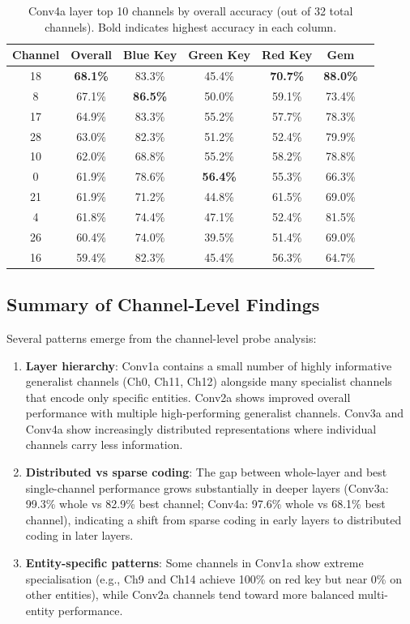 \documentclass[12pt,a4paper]{report}
\begin{document}
\begin{table}[H]
\centering
\caption[Conv4a top 10 channel probe accuracies]{Conv4a layer top 10 channels by overall accuracy (out of 32 total channels). Bold indicates highest accuracy in each column.}
\label{tab:conv4a_top10}
\begin{tabular}{ccccccc}
\toprule
Channel & Overall & Blue Key & Green Key & Red Key & Gem \\
\midrule
18 & \textbf{68.1\%} & 83.3\% & 45.4\% & \textbf{70.7\%} & \textbf{88.0\%} \\
8 & 67.1\% & \textbf{86.5\%} & 50.0\% & 59.1\% & 73.4\% \\
17 & 64.9\% & 83.3\% & 55.2\% & 57.7\% & 78.3\% \\
28 & 63.0\% & 82.3\% & 51.2\% & 52.4\% & 79.9\% \\
10 & 62.0\% & 68.8\% & 55.2\% & 58.2\% & 78.8\% \\
0 & 61.9\% & 78.6\% & \textbf{56.4\%} & 55.3\% & 66.3\% \\
21 & 61.9\% & 71.2\% & 44.8\% & 61.5\% & 69.0\% \\
4 & 61.8\% & 74.4\% & 47.1\% & 52.4\% & 81.5\% \\
26 & 60.4\% & 74.0\% & 39.5\% & 51.4\% & 69.0\% \\
16 & 59.4\% & 82.3\% & 45.4\% & 56.3\% & 64.7\% \\
\bottomrule
\end{tabular}
\end{table}

\subsection{Summary of Channel-Level Findings}

Several patterns emerge from the channel-level probe analysis:

\begin{enumerate}
\item \textbf{Layer hierarchy}: Conv1a contains a small number of highly informative generalist channels (Ch0, Ch11, Ch12) alongside many specialist channels that encode only specific entities. Conv2a shows improved overall performance with multiple high-performing generalist channels. Conv3a and Conv4a show increasingly distributed representations where individual channels carry less information. 

\item \textbf{Distributed vs sparse coding}: The gap between whole-layer and best single-channel performance grows substantially in deeper layers (Conv3a: 99.3\% whole vs 82.9\% best channel; Conv4a: 97.6\% whole vs 68.1\% best channel), indicating a shift from sparse coding in early layers to distributed coding in later layers.

\item \textbf{Entity-specific patterns}: Some channels in Conv1a show extreme specialisation (e.g., Ch9 and Ch14 achieve 100\% on red key but near 0\% on other entities), while Conv2a channels tend toward more balanced multi-entity performance.
\end{enumerate}
\end{document}
